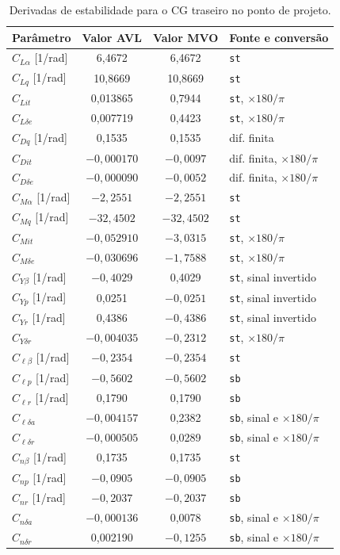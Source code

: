 \begin{table}[H]
\centering
\caption{Derivadas de estabilidade para o CG traseiro no ponto de projeto.}\label{tab:derivadas}
\renewcommand{\arraystretch}{1.15}
\begin{tabular}{lccl}
\toprule
Parâmetro & Valor AVL & Valor MVO & Fonte e conversão \\
\midrule
$C_{L\alpha}$ [1/rad] & 6,4672 & 6,4672 & \texttt{st} \\
$C_{Lq}$ [1/rad] & 10,8669 & 10,8669 & \texttt{st} \\
$C_{Lit}$ & 0,013865 & 0,7944 & \texttt{st}, $\times 180/\pi$ \\
$C_{L\delta e}$ & 0,007719 & 0,4423 & \texttt{st}, $\times 180/\pi$ \\
$C_{Dq}$ [1/rad] & 0,1535 & 0,1535 & dif. finita \\
$C_{Dit}$ & $-0{,}000170$ & $-0{,}0097$ & dif. finita, $\times 180/\pi$ \\
$C_{D\delta e}$ & $-0{,}000090$ & $-0{,}0052$ & dif. finita, $\times 180/\pi$ \\
$C_{M\alpha}$ [1/rad] & $-2{,}2551$ & $-2{,}2551$ & \texttt{st} \\
$C_{Mq}$ [1/rad] & $-32{,}4502$ & $-32{,}4502$ & \texttt{st} \\
$C_{Mit}$ & $-0{,}052910$ & $-3{,}0315$ & \texttt{st}, $\times 180/\pi$ \\
$C_{M\delta e}$ & $-0{,}030696$ & $-1{,}7588$ & \texttt{st}, $\times 180/\pi$ \\
$C_{Y\beta}$ [1/rad] & $-0{,}4029$ & 0,4029 & \texttt{st}, sinal invertido \\
$C_{Yp}$ [1/rad] & 0,0251 & $-0{,}0251$ & \texttt{st}, sinal invertido \\
$C_{Yr}$ [1/rad] & 0,4386 & $-0{,}4386$ & \texttt{st}, sinal invertido \\
$C_{Y\delta r}$ & $-0{,}004035$ & $-0{,}2312$ & \texttt{st}, $\times 180/\pi$ \\
$C_{\ell\beta}$ [1/rad] & $-0{,}2354$ & $-0{,}2354$ & \texttt{st} \\
$C_{\ell p}$ [1/rad] & $-0{,}5602$ & $-0{,}5602$ & \texttt{sb} \\
$C_{\ell r}$ [1/rad] & 0,1790 & 0,1790 & \texttt{sb} \\
$C_{\ell\delta a}$ & $-0{,}004157$ & 0,2382 & \texttt{sb}, sinal e $\times 180/\pi$ \\
$C_{\ell\delta r}$ & $-0{,}000505$ & 0,0289 & \texttt{sb}, sinal e $\times 180/\pi$ \\
$C_{n\beta}$ [1/rad] & 0,1735 & 0,1735 & \texttt{st} \\
$C_{np}$ [1/rad] & $-0{,}0905$ & $-0{,}0905$ & \texttt{sb} \\
$C_{nr}$ [1/rad] & $-0{,}2037$ & $-0{,}2037$ & \texttt{sb} \\
$C_{n\delta a}$ & $-0{,}000136$ & 0,0078 & \texttt{sb}, sinal e $\times 180/\pi$ \\
$C_{n\delta r}$ & 0,002190 & $-0{,}1255$ & \texttt{sb}, sinal e $\times 180/\pi$ \\
\bottomrule
\end{tabular}
\end{table}

